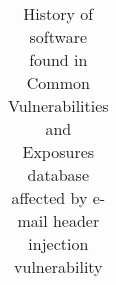 \begin{table}[tb]
\begin{tabular}{|c|p{4.7cm}|c|}
	\end{tabular}
	\caption{History of software found in Common Vulnerabilities and
      Exposures database affected by e-mail header injection
      vulnerability}
	\label{tab:history}
\end{table}
